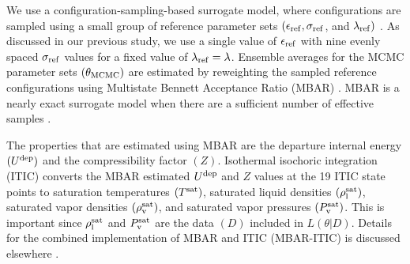 \documentclass[preprint,letterpaper,floatfix,citeautoscript,aip,jcp]{revtex4-1}
\begin{document}

We use a configuration-sampling-based surrogate model, where configurations are sampled using a small group of reference parameter sets $(\epsilon_{\rm ref}, \sigma_{\rm ref}$, and $\lambda_{\rm ref})$ \cite{Postdoc_1}. As discussed in our previous study, we use a single value of $\epsilon_{\rm ref}$ with nine evenly spaced $\sigma_{\rm ref}$ values for a fixed value of $\lambda_{\rm ref} = \lambda$. Ensemble averages for the MCMC parameter sets $(\theta_{\rm MCMC})$ are estimated by reweighting the sampled reference configurations using Multistate Bennett Acceptance Ratio (MBAR) \cite{shirts-chodera:jcp:2008:mbar}. MBAR is a nearly exact surrogate model when there are a sufficient number of effective samples \cite{Postdoc_1}.

The properties that are estimated using MBAR are the departure internal energy $(U^{\rm dep})$ and the compressibility factor $(Z)$. 
Isothermal isochoric integration (ITIC) converts the MBAR estimated $U^{\rm dep}$ and $Z$ values at the 19 ITIC state points to saturation temperatures $(T^{\rm sat})$, saturated liquid densities $(\rho_{\rm l}^{\rm sat})$, saturated vapor densities $(\rho_{\rm v}^{\rm sat})$, and saturated vapor pressures $(P_{\rm v}^{\rm sat})$. This is important since $\rho_{\rm l}^{\rm sat}$ and $P_{\rm v}^{\rm sat}$ are the data $(D)$ included in $L(\theta|D)$. Details for the combined implementation of MBAR and ITIC (MBAR-ITIC) is discussed elsewhere \cite{Postdoc_1}. 
\end{document}
